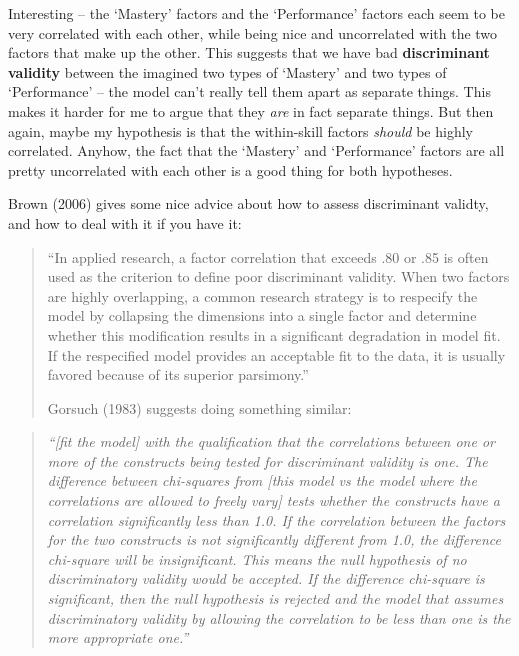 \documentclass[
  letterpaper,
  DIV=11,
  numbers=noendperiod]{scrreprt}
\begin{document}
Interesting -- the `Mastery' factors and the `Performance' factors each
seem to be very correlated with each other, while being nice and
uncorrelated with the two factors that make up the other. This suggests
that we have bad \textbf{discriminant validity} between the imagined two
types of `Mastery' and two types of `Performance' -- the model can't
really tell them apart as separate things. This makes it harder for me
to argue that they \emph{are} in fact separate things. But then again,
maybe my hypothesis is that the within-skill factors \emph{should} be
highly correlated. Anyhow, the fact that the `Mastery' and `Performance'
factors are all pretty uncorrelated with each other is a good thing for
both hypotheses.

Brown (2006) gives some nice advice about how to assess discriminant
validty, and how to deal with it if you have it:

\begin{quote}
``In applied research, a factor correlation that exceeds .80 or .85 is
often used as the criterion to define poor discriminant validity. When
two factors are highly overlapping, a common research strategy is to
respecify the model by collapsing the dimensions into a single factor
and determine whether this modification results in a significant
degradation in model fit. If the respecified model provides an
acceptable fit to the data, it is usually favored because of its
superior parsimony.''

Gorsuch (1983) suggests doing something similar:
\end{quote}

\begin{quote}
\emph{``{[}fit the model{]} with the qualification that the correlations
between one or more of the constructs being tested for discriminant
validity is one. The difference between chi-squares from {[}this model
vs the model where the correlations are allowed to freely vary{]} tests
whether the constructs have a correlation significantly less than 1.0.
If the correlation between the factors for the two constructs is not
significantly different from 1.0, the difference chi-square will be
insignificant. This means the null hypothesis of no discriminatory
validity would be accepted. If the difference chi-square is significant,
then the null hypothesis is rejected and the model that assumes
discriminatory validity by allowing the correlation to be less than one
is the more appropriate one.''}
\end{quote}
\end{document}
